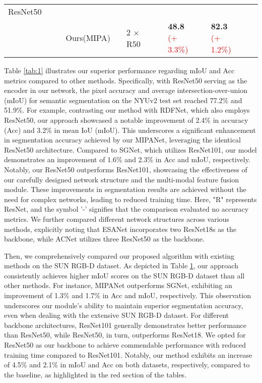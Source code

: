 \documentclass{aims}
\numberwithin{equation}{section}
\begin{document}
\begin{table}[t]
\begin{tabular}{lllllllllllll}
    ResNet50 &       &       &       &       &       &       &       &       &       &       &         \\
          &       &       & Ours(MIPA) &       &        2 $\times$  R50 &       &       & \textbf{48.8} \textcolor{red}{(+ 3.3\%)} &       &        \textbf{82.3} \textcolor{red}{(+ 1.2\%)} \\
    \bottomrule
    \end{tabular}\label{tab:2}\end{table}Table \ref{tab:1} illustrates our superior performance regarding mIoU and Acc metrics compared to other methods. Specifically, with ResNet50 serving as the encoder in our network, the pixel accuracy and average intersection-over-union (mIoU) for semantic segmentation on the NYUv2 test set reached 77.2\% and 51.9\%. For example, contrasting our method with RDFNet, which also employs ResNet50, our approach showcased a notable improvement of 2.4\% in accuracy (Acc) and 3.2\% in mean IoU (mIoU). This underscores a significant enhancement in segmentation accuracy achieved by our MIPANet, leveraging the identical ResNet50 architecture. Compared to SGNet, which utilizes ResNet101, our model demonstrates an improvement of 1.6\% and 2.3\% in Acc and mIoU, respectively. Notably, our ResNet50 outperforms ResNet101, showcasing the effectiveness of our carefully designed network structure and the multi-modal feature fusion module. These improvements in segmentation results are achieved without the need for complex networks, leading to reduced training time. Here, "R" represents ResNet, and the symbol '-' signifies that the comparison evaluated no accuracy metrics. We further compared different network structures across various methods, explicitly noting that ESANet incorporates two ResNet18s as the backbone, while ACNet utilizes three ResNet50 as the backbone.

Then, we comprehensively compared our proposed algorithm with existing methods on the SUN RGB-D dataset. As depicted in Table \ref{tab:2}, our approach consistently achieves higher mIoU scores on the SUN RGB-D dataset than all other methods.   For instance, MIPANet outperforms SGNet, exhibiting an improvement of 1.3\% and 1.7\% in Acc and mIoU, respectively. This observation underscores our module's ability to maintain superior segmentation accuracy, even when dealing with the extensive SUN RGB-D dataset. For different backbone architectures, ResNet101 generally demonstrates better performance than ResNet50, while ResNet50, in turn, outperforms ResNet18. We opted for ResNet50 as our backbone to achieve commendable performance with reduced training time compared to ResNet101.  Notably, our method exhibits an increase of 4.5\% and 2.1\% in mIoU and Acc on both datasets, respectively, compared to the baseline, as highlighted in the red section of the tables.
\end{document}
